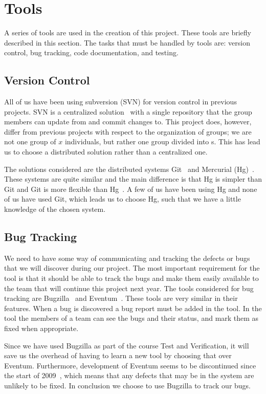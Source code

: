 \section{Tools}\label{subsec:tools}
A series of tools are used in the creation of this project.
These tools are briefly described in this section.
The tasks that must be handled by tools are: version control, bug tracking, code documentation, and testing.

\subsection{Version Control}
All of us have been using subversion (SVN) for version control in previous projects.
SVN is a centralized solution~\cite{subversion} with a single repository that the group members can update from and commit changes to.
This project does, however, differ from previous projects with respect to the organization of groups; we are not one group of $x$ individuals, but rather one group divided into \subgroup{}s.
This has lead us to choose a distributed solution rather than a centralized one.

The solutions considered are the distributed systems Git~\citep{githome} and Mercurial (Hg)~\citep{hghome}.
These systems are quite similar and the main difference is that Hg is simpler than Git and Git is more flexible than Hg~\cite{gitVsHg}.
A few of us have been using Hg and none of us have used Git, which leads us to choose Hg, such that we have a little knowledge of the chosen system.

\subsection{Bug Tracking}
We need to have some way of communicating and tracking the defects or bugs that we will discover during our project.
The most important requirement for the tool is that it should be able to track the bugs and make them easily available to the team that will continue this project next year.
The tools considered for bug tracking are Bugzilla~\cite{bugzillaFeat} and Eventum~\cite{eventumFeat}.
These tools are very similar in their features.
When a bug is discovered a bug report must be added in the tool.
In the tool the members of a team can see the bugs and their status, and mark them as fixed when appropriate.

Since we have used Bugzilla as part of the course Test and Verification, it will save us the overhead of having to learn a new tool by choosing that over Eventum.
Furthermore, development of Eventum seems to be discontinued since the start of 2009~\cite{eventumDiscont}, which means that any defects that may be in the system are unlikely to be fixed.
In conclusion we choose to use Bugzilla to track our bugs.

